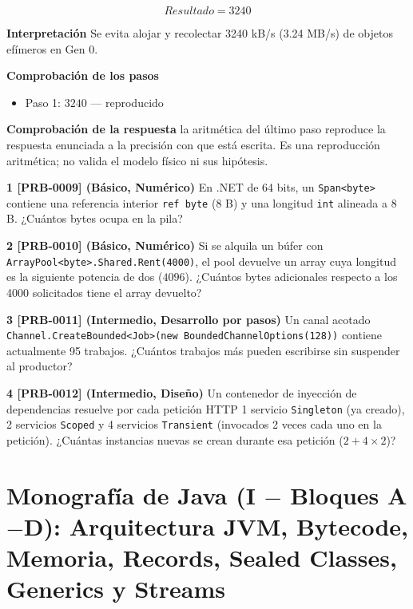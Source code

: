 \documentclass{book}
\begin{document}
\begin{tcolorbox}[title={Problema resuelto}, studiumworked, breakable]
\[
Resultado = 3240
\]

\noindent\textbf{Interpretación}
Se evita alojar y recolectar 3240 kB/s (3.24 MB/s) de objetos efímeros en Gen 0.

\noindent\textbf{Comprobación de los pasos}
\begin{itemize}
\item Paso 1: $3240$ — reproducido
\end{itemize}

\noindent\textbf{Comprobación de la respuesta} la aritmética del último paso reproduce la respuesta enunciada a la precisión con que está escrita. Es una reproducción aritmética; no valida el modelo físico ni sus hipótesis.
\end{tcolorbox}

\begin{tcolorbox}[title={Ejercicios}, studiumworked, breakable]

\noindent\textbf{1 [PRB-0009] (Básico, Numérico)}
En .NET de 64 bits, un \texttt{Span<byte>} contiene una referencia interior \texttt{ref byte} (8 B) y una longitud \texttt{int} alineada a 8 B. ¿Cuántos bytes ocupa en la pila?

\noindent\textbf{2 [PRB-0010] (Básico, Numérico)}
Si se alquila un búfer con \texttt{ArrayPool<byte>.Shared.Rent(4000)}, el pool devuelve un array cuya longitud es la siguiente potencia de dos (\(4096\)). ¿Cuántos bytes adicionales respecto a los 4000 solicitados tiene el array devuelto?

\noindent\textbf{3 [PRB-0011] (Intermedio, Desarrollo por pasos)}
Un canal acotado \texttt{Channel.CreateBounded<Job>(new BoundedChannelOptions(128))} contiene actualmente 95 trabajos. ¿Cuántos trabajos más pueden escribirse sin suspender al productor?

\noindent\textbf{4 [PRB-0012] (Intermedio, Diseño)}
Un contenedor de inyección de dependencias resuelve por cada petición HTTP 1 servicio \texttt{Singleton} (ya creado), 2 servicios \texttt{Scoped} y 4 servicios \texttt{Transient} (invocados 2 veces cada uno en la petición). ¿Cuántas instancias nuevas se crean durante esa petición (\(2 + 4 \times 2\))?
\end{tcolorbox}

\chapter{Monografía de Java (I \(-\) Bloques A\(-\)D): Arquitectura JVM, Bytecode, Memoria, Records, Sealed Classes, Generics y Streams}
\label{chap:cap03-java-jvm-bytecode-memoria-generics-streams}
\end{document}

